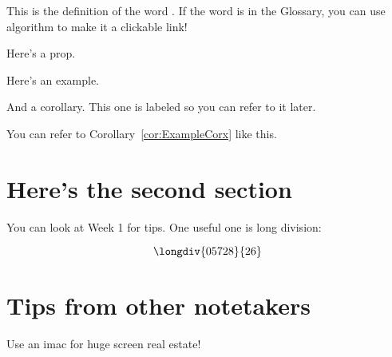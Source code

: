 \begin{definition} This is the definition of the word .  If the word is in the Glossary, you can use \gls{algorithm} to make it a clickable link!
\end{definition}

\begin{proposition} Here's a prop.\end{proposition}

\begin{example} Here's an example. \end{example}

\begin{corollary}\label{cor:ExampleCorx} And a corollary.  This one is labeled so you can refer to it later.\end{corollary}

You can refer to Corollary~\ref{cor:ExampleCorx} like this.

\section{Here's the second section}
You can look at Week 1 for tips.  One useful one is long division:

\[
\longdiv{05728}{26}
\]

\section{Tips from other notetakers}

Use an imac for huge screen real estate!